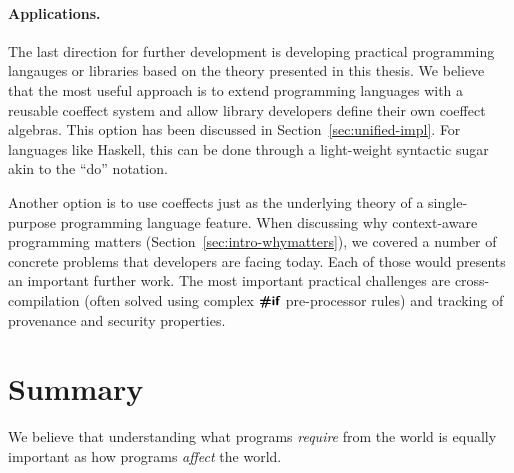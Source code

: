 
\paragraph{Applications.}
The last direction for further development is developing practical programming langauges or
libraries based on the theory presented in this thesis. We believe that the most useful approach
is to extend programming languages with a reusable coeffect system and allow library developers 
define their own coeffect algebras. This option has been discussed in Section~\ref{sec:unified-impl}.
For languages like Haskell, this can be done through a light-weight syntactic sugar akin to the
``do'' notation.

Another option is to use coeffects just as the underlying theory of a single-purpose programming
language feature. When discussing why context-aware programming matters (Section~\ref{sec:intro-whymatters}),
we covered a number of concrete problems that developers are facing today. Each of those would
presents an important further work. The most important practical challenges are cross-compilation 
(often solved using complex $\prepk{\#if}$ pre-processor rules) and tracking of provenance
and security properties.



%
%

\section{Summary}
\label{sec:conc-conclusions}

We believe that understanding what programs \emph{require} from the world is equally important as 
how programs \emph{affect} the world. 

